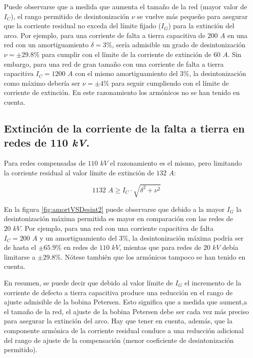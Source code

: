             Puede observarse que a medida que aumenta el tamaño de la red (mayor valor de $I_\textit{C}$), el rango permitido de desintonización $\nu$ se vuelve más pequeño para asegurar que la corriente residual no exceda del límite fijado ($I_\textit{G}$) para la extinción del arco. Por ejemplo, para una corriente de falta a tierra capacitiva de $200\textit{ A}$ en una red con un amortiguamiento $\delta=3\!\text{\%}$, sería admisible un grado de desintonización $\nu = \pm 29.8\!\text{\%}$ para cumplir con el límite de la corriente de extinción de $60\textit{ A}$. Sin embargo, para una red de gran tamaño con una corriente de falta a tierra capacitiva $I_\textit{C} = 1200\textit{ A}$ con el mismo amortiguamiento del 3\!\%, la desintonización como máximo debería ser $\nu = \pm 4\!\text{\%}$ para seguir cumpliendo con el límite de corriente de extinción. En este razonamiento los armónicos no se han tenido en cuenta.\newline

        \subsection{Extinción de la corriente de la falta a tierra en redes de 110 \textit{kV}.}

            Para redes compensadas de $110\textit{ kV}$ el razonamiento es el mismo, pero limitando la corriente residual al valor límite de extinción de $132\textit{ A}$:

            \begin{equation}
                1132\textit{ A} \geq I_\textit{C}\cdot \sqrt{\delta^2+\nu^2}
            \end{equation}

            En la figura \ref{fig:amortVSDesint2} puede observarse que debido a la mayor $I_\textit{G}$ la desintonización máxima permitida es mayor en comparación con las redes de $20\textit{ kV}$. Por ejemplo, para una red con una corriente capacitiva de falta $I_\textit{C}=200\textit{ A}$ y un amortiguamiento del $3$\!\%, la desintonización máxima podría ser de hasta el $\pm65.9$\!\% en redes de $110\textit{ kV}$, mientas que para redes de $20\textit{ kV}$ debía limitarse a $\pm29.8$\!\%. Nótese también que los armónicos tampoco se han tenido en cuenta.

            En resumen, se puede decir que debido al valor límite de $I_\textit{G}$ el incremento de la corriente de defecto a tierra capacitiva produce una reducción en el rango de ajuste admisible de la bobina Petersen. Esto significa que a medida que aument,a el tamaño de la red, el ajuste de la bobina Petersen debe ser cada vez más preciso para asegurar la extinción del arco. Hay que tener en cuenta, además, que la componente armónica de la corriente residual conduce a una reducción adicional del rango de ajuste de la compensación (menor coeficiente de desintonización permitido).
            
